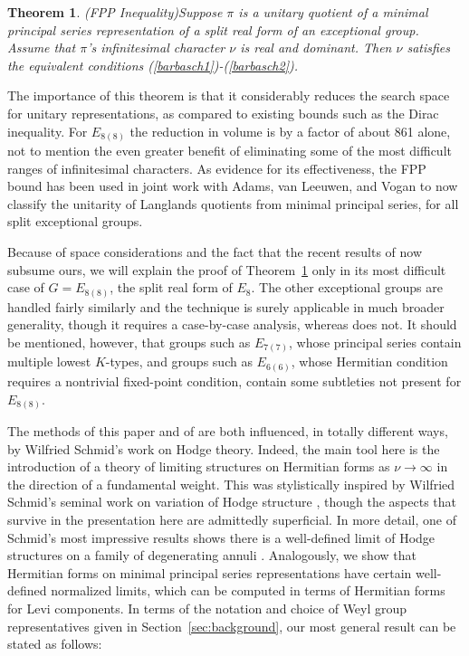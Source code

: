 \documentclass[12pt]{article}
\newtheorem{thm}[equation]{Theorem}
\newcommand{\secref}[1]{Section~\ref{#1}}
\numberwithin{equation}{section}
\renewcommand\({\left(}
\renewcommand\){\right)}
\begin{document}
\begin{thm}(FPP Inequality)\label{mainthm}
 Suppose $\pi$ is a unitary quotient of a minimal principal series representation of a split real form of an exceptional group.  Assume that $\pi$'s infinitesimal character $\nu$ is real and dominant.   Then $\nu$ satisfies the equivalent conditions (\ref{barbasch1})-(\ref{barbasch2}).
\end{thm}

The importance of this theorem is that it considerably reduces the search space for unitary representations, as compared to existing bounds such as the Dirac inequality.  For $E_{8(8)}$ the reduction in volume is by a factor of about 861 alone, not to mention the even greater benefit of eliminating some of the most difficult ranges of infinitesimal characters.   As evidence for its effectiveness, the FPP bound has been used  in joint work with Adams, van Leeuwen, and Vogan to now classify the unitarity of Langlands quotients from minimal principal series, for all split exceptional groups.


Because of space considerations and the fact that the recent results of   \cite{DM-B} now subsume ours, we will explain the proof of Theorem~\ref{mainthm}  only in its most difficult case of $G=E_{8(8)}$, the split real form of $E_8$.  The other exceptional groups are handled fairly similarly and the technique is surely applicable in much broader generality, though it requires a case-by-case analysis, whereas \cite{DM-B} does not.  It should be mentioned, however,  that groups such as $E_{7(7)}$, whose principal series contain multiple lowest $K$-types, and groups such as $E_{6(6)}$, whose Hermitian condition requires a nontrivial fixed-point condition,  contain some  subtleties not present for $E_{8(8)}$.

The methods of this paper and of \cite{DM-B} are both influenced, in totally different ways, by Wilfried Schmid's work on Hodge theory.  Indeed, the main tool here is the introduction of a theory of limiting structures on Hermitian forms as $\nu\rightarrow\infty$ in the direction of a fundamental weight.  This was stylistically inspired by Wilfried Schmid's seminal work on variation of Hodge structure \cite{SchmidHodge1,SchmidHodge2}, though the  aspects that survive in the presentation here are admittedly superficial.  In more detail, one of Schmid's most impressive results  shows there is a well-defined limit of Hodge structures on a family of degenerating annuli \cite{SchmidHodge1}.  Analogously, we show that Hermitian forms on minimal principal series representations have certain well-defined normalized limits, which can be computed in terms of Hermitian forms for  Levi components.  In terms of the notation and choice of Weyl group representatives given in \secref{sec:background}, our most general result can be stated as follows:
\end{document}
